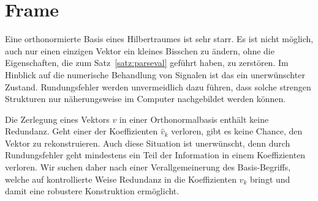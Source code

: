 %
%
%
\section{Frame\label{section:frame}}
%
Eine orthonormierte Basis eines Hilbertraumes ist sehr starr.
Es ist nicht möglich, auch nur einen einzigen Vektor ein kleines
Bisschen zu ändern, ohne die Eigenschaften, die zum Satz~\ref{satz:parseval}
geführt haben, zu zerstören.
Im Hinblick auf die numerische Behandlung von Signalen ist das
ein unerwünschter Zustand.
Rundungsfehler werden unvermeidlich dazu führen, dass solche strengen
Strukturen nur näherungsweise im Computer nachgebildet werden 
können.

Die Zerlegung eines Vektors $v$ in einer Orthonormalbasis enthält keine
Redundanz.
Geht einer der Koeffizienten $\hat{v}_k$ verloren, gibt es keine
Chance, den Vektor zu rekonstruieren.
Auch diese Situation ist unerwünscht, denn durch Rundungsfehler geht
mindestens ein Teil der Information in einem Koeffizienten verloren.
Wir suchen daher nach einer Verallgemeinerung des Basis-Begriffs, welche
auf kontrollierte Weise Redundanz in die Koeffizienten $\hat{v}_k$
bringt und damit eine robustere Konstruktion ermöglicht.

%
%

